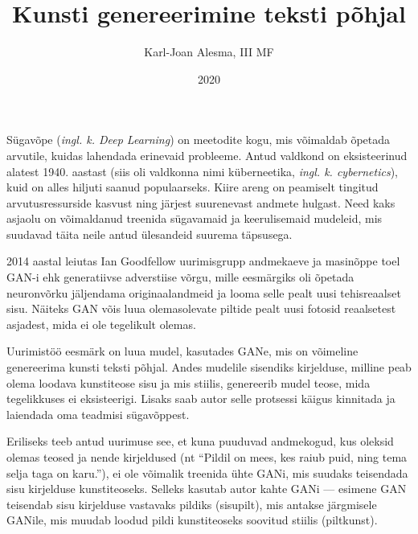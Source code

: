 \documentclass{vilgym}
\title{Kunsti genereerimine teksti põhjal}
\author{Karl-Joan Alesma, III MF}
\date{2020}
\begin{document}
	\maketitle
	\tableofcontents

	\newcommand*{\seefig}[1]{(\hyperref[fig:#1]{vt~joonis~\ref{fig:#1}})}
	\newcommand*{\inglk}[1]{(\textit{ingl. k. #1})}

	Sügavõpe \inglk{Deep Learning} on meetodite kogu, mis võimaldab õpetada arvutile, kuidas lahendada erinevaid probleeme. Antud valdkond on eksisteerinud alatest 1940. aastast (siis oli valdkonna nimi küberneetika, \textit{ingl. k. cybernetics}), kuid on alles hiljuti saanud populaarseks. Kiire areng on peamiselt tingitud arvutusressurside kasvust ning järjest suurenevast andmete hulgast. Need kaks asjaolu on võimaldanud treenida sügavamaid ja keerulisemaid mudeleid, mis suudavad täita neile antud ülesandeid suurema täpsusega. \parencite{deeplearningbook}	 


	2014 aastal leiutas Ian Goodfellow uurimisgrupp andmekaeve ja masinõppe toel GAN-i ehk generatiivse adverstiise võrgu, mille eesmärgiks oli õpetada neuronvõrku jäljendama originaalandmeid ja looma selle pealt uusi tehisreaalset sisu. Näiteks GAN võis luua olemasolevate piltide pealt uusi fotosid reaalsetest asjadest, mida ei ole tegelikult olemas. \parencite{gan}

	Uurimistöö eesmärk on luua mudel, kasutades GANe, mis on võimeline genereerima kunsti teksti põhjal. Andes mudelile sisendiks kirjelduse, milline peab olema loodava kunstiteose sisu ja mis stiilis, genereerib mudel teose, mida tegelikkuses ei eksisteerigi. Lisaks saab autor selle protsessi käigus kinnitada ja laiendada oma teadmisi sügavõppest.

	Eriliseks teeb antud uurimuse see, et kuna puuduvad andmekogud, kus oleksid olemas teosed ja nende kirjeldused (nt \enquote{Pildil on mees, kes raiub puid, ning tema selja taga on karu.}), ei ole võimalik treenida ühte GANi, mis suudaks teisendada sisu kirjelduse kunstiteoseks. Selleks kasutab autor kahte GANi --- esimene GAN teisendab sisu kirjelduse vastavaks pildiks (sisu\textrightarrow pilt), mis antakse järgmisele GANile, mis muudab loodud pildi kunstiteoseks soovitud stiilis (pilt\textrightarrow kunst).
\end{document}
